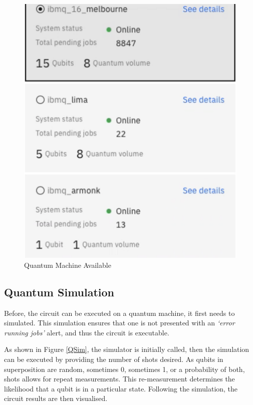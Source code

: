 \begin{figure}[H]
      \centering
      \includegraphics[scale=0.4]{background/QMachineOptions.png}
      \caption{ Quantum Machine Available }
      \label{QMachineAvail}
\end{figure}


\subsection{Quantum Simulation}

Before, the circuit can be executed on a quantum machine, it first needs to simulated. This simulation ensures that one is not presented with an \emph{‘error running jobs’} alert, and thus the circuit is executable. 

As shown in Figure \ref{QSim}, the simulator is initially called, then the simulation can be executed by providing the number of shots desired. As qubits in superposition are random, sometimes 0, sometimes 1, or a probability of both, shots allows for repeat measurements. This re-measurement  determines the likelihood that a qubit is in a particular state. Following the simulation, the circuit results are then visualised.

